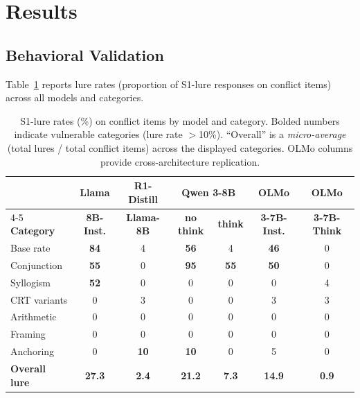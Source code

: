 \documentclass{article}
\begin{document}

\section{Results}
\label{sec:results}

\subsection{Behavioral Validation}
\label{sec:results_behavioral}

Table~\ref{tab:behavioral} reports lure rates (proportion of S1-lure
responses on conflict items) across all models and categories.

\begin{table}[t]
\centering
\caption{S1-lure rates (\%) on conflict items by model and category.
  Bolded numbers indicate vulnerable categories (lure rate $>$10\%).
  ``Overall'' is a \emph{micro-average} (total lures / total conflict items) across the displayed categories.
  OLMo columns provide cross-architecture replication.}
\label{tab:behavioral}
\vspace{4pt}
\small
\begin{tabular}{lcccccc}
\toprule
& \textbf{Llama} & \textbf{R1-Distill} & \multicolumn{2}{c}{\textbf{Qwen 3-8B}} & \textbf{OLMo} & \textbf{OLMo} \\
\cmidrule(lr){4-5}
\textbf{Category} & \textbf{8B-Inst.} & \textbf{Llama-8B} & \textbf{no think} & \textbf{think} & \textbf{3-7B-Inst.} & \textbf{3-7B-Think} \\
\midrule
Base rate      & \textbf{84} & 4   & \textbf{56} & 4   & \textbf{46} & 0 \\
Conjunction    & \textbf{55} & 0   & \textbf{95} & \textbf{55} & \textbf{50} & 0 \\
Syllogism      & \textbf{52} & 0   & 0   & 0   & 0   & 4 \\
\midrule
CRT variants   & 0   & 3   & 0   & 0   & 3   & 3 \\
Arithmetic     & 0   & 0   & 0   & 0   & 0   & 0 \\
Framing        & 0   & 0   & 0   & 0   & 0   & 0 \\
Anchoring      & 0   & \textbf{10} & \textbf{10} & 0 & 5 & 0 \\
\midrule
\textbf{Overall lure} & \textbf{27.3} & \textbf{2.4} & \textbf{21.2} & \textbf{7.3} & \textbf{14.9} & \textbf{0.9} \\
\bottomrule
\end{tabular}
\end{table}
\end{document}
